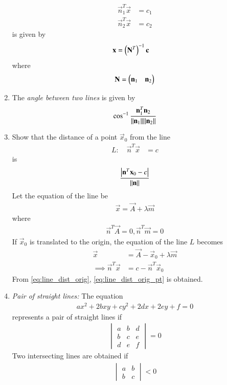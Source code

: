 \begin{enumerate}[label=\arabic*.,ref=\thesubsection.\theenumi]
\begin{align}
\vec{n}_1^T\vec{x} &=c_1
\\
\vec{n}_2^T\vec{x} &=c_2
\end{align}
is given by 
\begin{align}
\mathbf{x} &=\left(\mathbf{N}^T\right)^{-1}\mathbf{c}
\end{align}
where 
\begin{align}
\mathbf{N} = \begin{pmatrix}\mathbf{n}_1 & \mathbf{n}_2\end{pmatrix}
\end{align}
\item The {\em angle between two lines} is given by 
\begin{align}
\cos ^{-1} \frac{\mathbf{n}_1 ^T \mathbf{n}_2}{\lVert\mathbf{n}_1\rVert  \lVert\mathbf{n}_2\rVert}
\end{align}
\item Show that the distance of a point $\vec{x}_0$ from the line 
\begin{align}
L: \quad \vec{n}^T\vec{x} &=c
\end{align}
is 
\begin{align}
\frac{\left\vert\mathbf{n}^T\mathbf{x}_0-c\right\vert}{\lVert\mathbf{n}\rVert} 
\end{align}
\solution Let the equation of the line be 
\begin{align}
\vec{x} = \vec{A} + \lambda \vec{m}
\end{align}
%
where 
\begin{align}
\label{eq:line_dist_orig_pt}
\vec{n}^T\vec{A} = 0, \vec{n}^T\vec{m} = 0
\end{align}
If $\vec{x}_0$ is translated to the origin, the equation of the line $L$ becomes 
\begin{align}
\vec{x} &= \vec{A}- \vec{x}_0+ \lambda \vec{m}
\\
\implies 
\vec{n}^T\vec{x} &=c-\vec{n}^T\vec{x}_0
\end{align}
From \eqref{eq:line_dist_orig}, \eqref{eq:line_dist_orig_pt} is obtained.
\item {\em Pair of straight lines:} The equation
\begin{align}
ax^2+2bxy+cy^2+2dx+2ey+f=0
\end{align}
%
represents a pair of straight lines if 
\begin{align}
\begin{vmatrix}
a & b & d
\\
b & c & e
\\
d & e & f
\end{vmatrix}
= 0
\end{align}
%
Two intersecting lines are obtained if 
\begin{align}
\begin{vmatrix}
a & b 
\\
b & c 
\end{vmatrix}
< 0
\end{align}
\end{enumerate}
